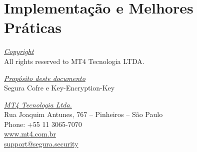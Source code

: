 \section{Implementação e Melhores Práticas}


\vspace*{\fill}
\begin{flushright}
	\underline{\textit{Copyright}}\\
	All rights reserved to MT4 Tecnologia LTDA.\bigskip

	\underline{\textit{Propósito deste documento}}\\
	Segura Cofre e Key-Encryption-Key\bigskip
	
	\underline{\textit{MT4 Tecnologia Ltda.}}\\
	Rua Joaquim Antunes, 767 – Pinheiros – São Paulo\\
	Phone: +55 11 3065-7070\\
	\url{www.mt4.com.br}\\
	\href{mailto:support@segura.security}{support@segura.security}\\
\end{flushright}
